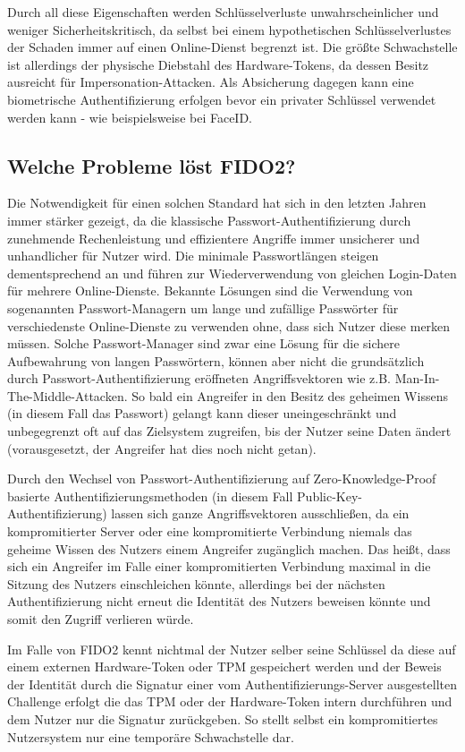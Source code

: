 \documentclass[journal]{IEEEtran}
\begin{document}
Durch all diese Eigenschaften werden Schlüsselverluste unwahrscheinlicher und
weniger Sicherheitskritisch, da selbst bei einem hypothetischen
Schlüsselverlustes der Schaden immer auf einen Online-Dienst begrenzt ist. Die
größte Schwachstelle ist allerdings der physische Diebstahl des
Hardware-Tokens, da dessen Besitz ausreicht für Impersonation-Attacken. Als
Absicherung dagegen kann eine biometrische Authentifizierung erfolgen bevor ein
privater Schlüssel verwendet werden kann - wie beispielsweise bei FaceID.\

\subsection{Welche Probleme löst FIDO2?}

Die Notwendigkeit für einen solchen Standard hat sich in den letzten Jahren
immer stärker gezeigt, da die klassische Passwort-Authentifizierung durch
zunehmende Rechenleistung und effizientere Angriffe immer unsicherer und
unhandlicher für Nutzer wird. Die minimale Passwortlängen steigen
dementsprechend an und führen zur Wiederverwendung von gleichen Login-Daten für
mehrere Online-Dienste. Bekannte Lösungen sind die Verwendung von sogenannten
Passwort-Managern um lange und zufällige Passwörter für verschiedenste
Online-Dienste zu verwenden ohne, dass sich Nutzer diese merken müssen. Solche
Passwort-Manager sind zwar eine Lösung für die sichere Aufbewahrung von langen
Passwörtern, können aber nicht die grundsätzlich durch
Passwort-Authentifizierung eröffneten Angriffsvektoren wie z.B.
Man-In-The-Middle-Attacken. So bald ein Angreifer in den Besitz des geheimen
Wissens (in diesem Fall das Passwort) gelangt kann dieser uneingeschränkt und
unbegegrenzt oft auf das Zielsystem zugreifen, bis der Nutzer seine Daten
ändert (vorausgesetzt, der Angreifer hat dies noch nicht getan).

Durch den Wechsel von Passwort-Authentifizierung auf Zero-Knowledge-Proof
basierte Authentifizierungsmethoden (in diesem Fall
Public-Key-Authentifizierung) lassen sich ganze Angriffsvektoren ausschließen,
da ein kompromitierter Server oder eine kompromitierte Verbindung niemals das
geheime Wissen des Nutzers einem Angreifer zugänglich machen. Das heißt, dass
sich ein Angreifer im Falle einer kompromitierten Verbindung maximal in die
Sitzung des Nutzers einschleichen könnte, allerdings bei der nächsten
Authentifizierung nicht erneut die Identität des Nutzers beweisen könnte und
somit den Zugriff verlieren würde.

Im Falle von FIDO2 kennt nichtmal der Nutzer selber seine Schlüssel da diese
auf einem externen Hardware-Token oder TPM gespeichert werden und der Beweis
der Identität durch die Signatur einer vom Authentifizierungs-Server
ausgestellten Challenge erfolgt die das TPM oder der Hardware-Token intern
durchführen und dem Nutzer nur die Signatur zurückgeben. So stellt selbst ein
kompromitiertes Nutzersystem nur eine temporäre Schwachstelle dar.
\end{document}
